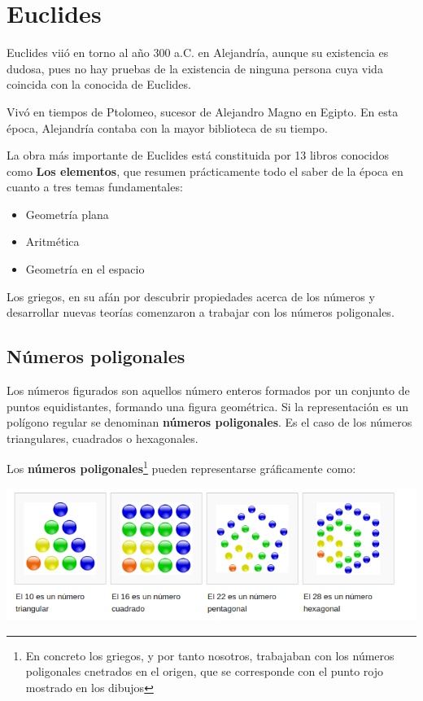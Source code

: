 \documentclass{apuntes}
\begin{document}
\section{Euclides}
Euclides viió en torno al año 300 a.C. en Alejandría, aunque su existencia es dudosa, pues no hay pruebas de la existencia de ninguna persona cuya vida coincida con la conocida de Euclides.

Vivó en tiempos de Ptolomeo, sucesor de Alejandro Magno en Egipto. En esta época, Alejandría contaba con la mayor biblioteca de su tiempo.

La obra más importante de Euclides está constituida por 13 libros conocidos como \textbf{Los elementos}, que resumen prácticamente todo el saber de la época en cuanto a tres temas fundamentales:
\begin{itemize}
\item Geometría plana
\item Aritmética
\item Geometría en el espacio
\end{itemize}

Los griegos, en su afán por descubrir propiedades acerca de los números y desarrollar nuevas teorías comenzaron a trabajar con los números poligonales.

\subsection{Números poligonales}

\begin{defn}
Los números figurados son aquellos número enteros formados por un conjunto de puntos equidistantes, formando una figura geométrica. Si la representación es un polígono regular se denominan \textbf{números poligonales}. Es el caso de los números triangulares, cuadrados o hexagonales.
\end{defn}

Los \textbf{números poligonales}\footnote{En concreto los griegos, y por tanto nosotros, trabajaban con los números poligonales cnetrados en el origen, que se corresponde con el punto rojo mostrado en los dibujos} pueden representarse gráficamente como:
\begin{center}
\includegraphics[width=\textwidth]{img/numeros_poligonales.png}
\end{center}
\end{document}
